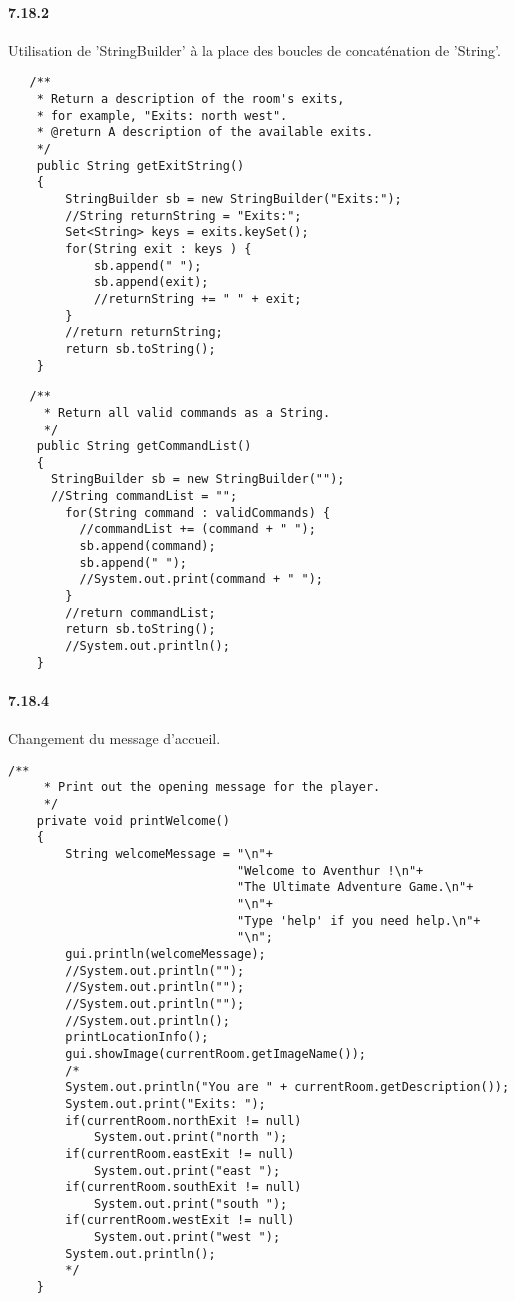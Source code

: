 \documentclass[11pt,a4paper]{report}
\begin{document}
\paragraph{7.18.2}
Utilisation de 'StringBuilder' à la place des boucles de concaténation de 'String'.
\begin{lstlisting}
   /**
    * Return a description of the room's exits,
    * for example, "Exits: north west".
    * @return A description of the available exits.
    */
    public String getExitString()
    {
        StringBuilder sb = new StringBuilder("Exits:");
        //String returnString = "Exits:";
        Set<String> keys = exits.keySet();
        for(String exit : keys ) {
            sb.append(" ");
            sb.append(exit);
            //returnString += " " + exit;
        }
        //return returnString;
        return sb.toString();
    }
\end{lstlisting}
\begin{lstlisting}
   /**
     * Return all valid commands as a String.
     */
    public String getCommandList()
    {
      StringBuilder sb = new StringBuilder("");
      //String commandList = "";
        for(String command : validCommands) {
          //commandList += (command + " ");
          sb.append(command);
          sb.append(" ");
          //System.out.print(command + " ");
        }
        //return commandList;
        return sb.toString();
        //System.out.println();
    }
\end{lstlisting}

\paragraph{7.18.4}
Changement du message d’accueil.
\begin{lstlisting}
/**
     * Print out the opening message for the player.
     */
    private void printWelcome()
    {
        String welcomeMessage = "\n"+
                                "Welcome to Aventhur !\n"+
                                "The Ultimate Adventure Game.\n"+
                                "\n"+
                                "Type 'help' if you need help.\n"+
                                "\n";
        gui.println(welcomeMessage);
        //System.out.println("");
        //System.out.println("");
        //System.out.println("");
        //System.out.println();
        printLocationInfo();
        gui.showImage(currentRoom.getImageName());
        /*
        System.out.println("You are " + currentRoom.getDescription());
        System.out.print("Exits: ");
        if(currentRoom.northExit != null)
            System.out.print("north ");
        if(currentRoom.eastExit != null)
            System.out.print("east ");
        if(currentRoom.southExit != null)
            System.out.print("south ");
        if(currentRoom.westExit != null)
            System.out.print("west ");
        System.out.println();
        */
    }
\end{lstlisting}
\end{document}

